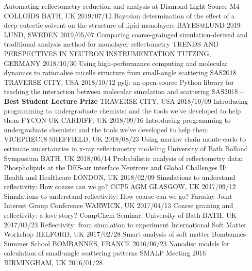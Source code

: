 \begin{cvhonors}
  \cvhonor
    {Automating reflectometry reduction and analysis at Diamond Light Source}
    {M4 COLLOIDS}
    {BATH, UK}
    {2019/07/12}
  \cvhonor
    {Bayesian determination of the effect of a deep eutectic solvent on the structure of lipid monolayers}
    {BAYES@LUND 2019}
    {LUND, SWEDEN}
    {2019/05/07}
  \cvhonor
    {Comparing coarse-grainged simulation-derived and traditional analysis method for monolayer reflectometry}
    {TRENDS AND PERSPECTIVES IN NEUTRON INSTRUMENTATION}
    {TUTZING, GERMANY}
    {2018/10/30}
  \cvhonor
    {Using high-performance computing and molecular dynamics to rationalise micelle structure from small-angle scattering}
    {SAS2018}
    {TRAVERSE CITY, USA}
    {2018/10/12}
  \cvhonor
    {pylj: an open-source Python library for teaching the interaction between molecular simulation and scattering}
	{SAS2018 -- \textbf{Best Student Lecture Prize}}
    {TRAVERSE CITY, USA}
    {2018/10/09}
  \cvhonor
    {Introducing programming to undergraduate chemists: and the tools we've developed to help them}
    {PYCON UK}
    {CARDIFF, UK}
    {2018/09/16}
  \cvhonor
    {Introducing programming to undergraduate chemists: and the tools we've developed to help them}
    {VICEPHEC18}
    {SHEFFIELD, UK}
    {2018/08/23}
  \cvhonor
    {Using markov chain monte-carlo to estimate uncertainties in x-ray reflectometry modeling}
    {University of Bath Bolland Symposium}
    {BATH, UK}
    {2018/06/14}
  \cvhonor
    {Probabilistic analysis of reflectometry data: Phospholipids at the DES-air interface}
    {Neutrons and Global Challenges II: Health and Healthcare}
    {LONDON, UK}
    {2018/02/09}
  \cvhonor
    {Simulations to understand reflectivity: How coarse can we go?}
    {CCP5 AGM}
    {GLASGOW, UK}
    {2017/09/12}
  \cvhonor
  	{Simulations to understand reflectivity: How coarse can we go?}
    {Faraday Joint Interest Group Conference}
    {WARWICK, UK}
    {2017/04/13}
  \cvhonor
  	{Coarse graining and reflectivity: a love story?}
    {CompChem Seminar, University of Bath}
    {BATH, UK}
    {2017/03/23}
  \cvhonor
  	{Reflectivity: from simulation to experiment}
    {International Soft Matter Workshop}
    {HELFORD, UK}
    {2017/02/28}
  \cvhonor
    {Smart analysis of soft matter}
    {Bombannes Summer School}
    {BOMBANNES, FRANCE}
    {2016/06/23}
  \cvhonor
    {Nanodisc models for calculation of small-angle scattering patterns}
    {SMALP Meeting 2016}
    {BIRMINGHAM, UK}
    {2016/01/28}
\end{cvhonors}

